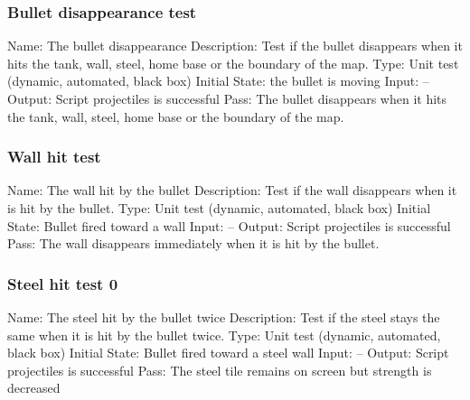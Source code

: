 \documentclass{article}
\begin{document}
\subsubsection{Bullet disappearance test}
Name:  The bullet disappearance \newline
Description: Test if the bullet disappears when it hits the tank, wall, steel,
 home base or the boundary of the map. \newline
Type: Unit test (dynamic, automated, black box) \newline
Initial State:  the bullet is moving\newline
Input: --\newline
Output: Script projectiles is successful  \newline
Pass: The bullet disappears when it hits the tank, wall, steel, home base or 
the boundary of the map. \newline

\subsubsection{Wall hit test}
Name:  The wall hit by the bullet\newline
Description: Test if the wall disappears when it is hit by the bullet. \newline
Type: Unit test (dynamic, automated, black box) \newline
Initial State:  Bullet fired toward a wall \newline
Input: --\newline
Output: Script projectiles is successful  \newline
Pass:  The wall disappears immediately when it is hit by the bullet. \newline

\subsubsection{Steel hit test 0}
Name:  The steel hit by the bullet twice\newline
Description: Test if the steel stays the same when it is hit by the bullet 
twice. \newline
Type: Unit test (dynamic, automated, black box) \newline
Initial State:  Bullet fired toward a steel wall \newline
Input: --\newline
Output: Script projectiles is successful  \newline
Pass:  The steel tile remains on screen but strength is decreased \newline
\end{document}
